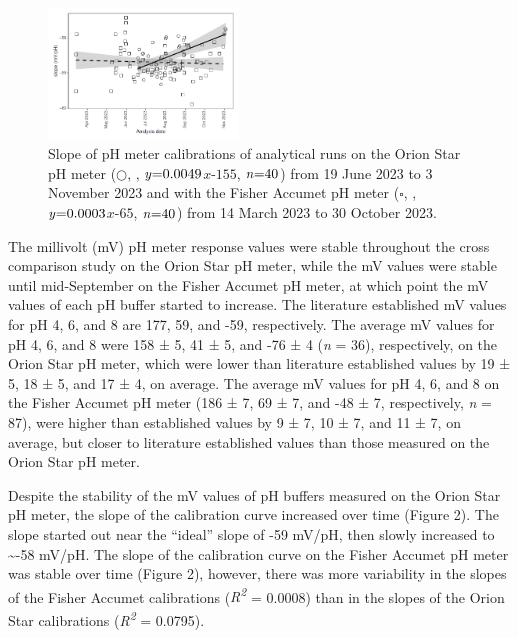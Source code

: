 \documentclass[
]{article}
\DeclareRobustCommand{\solidline}{\raisebox{2pt}{\tikz{\draw[thick](0,0) -- (0.5,0);}}}
\DeclareRobustCommand{\dashedline}{\raisebox{2pt}{\tikz{\draw[dashed, thick](0,0) -- (0.5,0);}}}
\begin{document}
\begin{figure}
  \vspace{-0.6cm}
  \includegraphics[width=0.45\textwidth]{mV_slope.pdf}
  \caption{Slope of pH meter calibrations of analytical runs on the Orion Star pH meter ($\bigcirc$, \protect\solidline, $\mbox{\textit{y}=0.0049}$$\textit{x}$$\mbox{-155}$, $\mbox{\textit{n}=40}$) from 19 June 2023 to 3 November 2023 and with the Fisher Accumet pH meter ($\square$, \protect\dashedline, $\mbox{\textit{y}=0.0003}$$\textit{x}$$\mbox{-65}$, $\mbox{\textit{n}=40}$) from 14 March 2023 to 30 October 2023.}
\end{figure}

The millivolt (mV) pH meter response values were stable throughout the
cross comparison study on the Orion Star pH meter, while the mV values
were stable until mid-September on the Fisher Accumet pH meter, at which
point the mV values of each pH buffer started to increase. The
literature established mV values for pH 4, 6, and 8 are 177, 59, and
-59, respectively. The average mV values for pH 4, 6, and 8 were 158 ±
5, 41 ± 5, and -76 ± 4 (\emph{n} = 36), respectively, on the Orion Star
pH meter, which were lower than literature established values by 19 ± 5,
18 ± 5, and 17 ± 4, on average. The average mV values for pH 4, 6, and 8
on the Fisher Accumet pH meter (186 ± 7, 69 ± 7, and -48 ± 7,
respectively, \emph{n} = 87), were higher than established values by 9 ±
7, 10 ± 7, and 11 ± 7, on average, but closer to literature established
values than those measured on the Orion Star pH meter.

Despite the stability of the mV values of pH buffers measured on the
Orion Star pH meter, the slope of the calibration curve increased over
time (Figure 2). The slope started out near the ``ideal'' slope of -59
mV/pH, then slowly increased to \textasciitilde-58 mV/pH. The slope of
the calibration curve on the Fisher Accumet pH meter was stable over
time (Figure 2), however, there was more variability in the slopes of
the Fisher Accumet calibrations (\emph{R\textsuperscript{2}} = 0.0008)
than in the slopes of the Orion Star calibrations
(\emph{R\textsuperscript{2}} = 0.0795). \pagebreak
\end{document}
